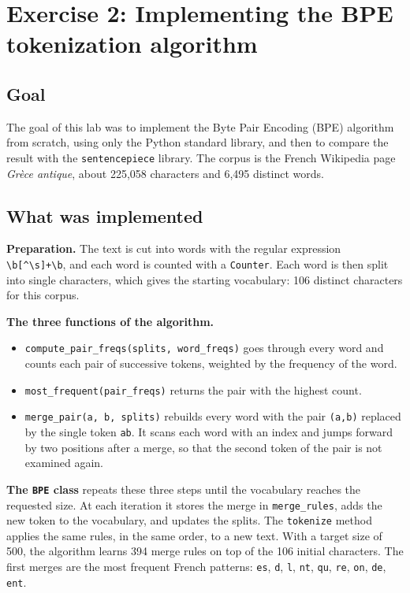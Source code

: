 \section{Exercise 2: Implementing the BPE tokenization algorithm}


\subsection*{Goal}

The goal of this lab was to implement the Byte Pair Encoding (BPE) algorithm from
scratch, using only the Python standard library, and then to compare the result with
the \texttt{sentencepiece} library. The corpus is the French Wikipedia page
\emph{Grèce antique}, about 225{,}058 characters and 6{,}495 distinct words.

\subsection*{What was implemented}

\textbf{Preparation.} The text is cut into words with the regular expression
\verb|\b[^\s]+\b|, and each word is counted with a \texttt{Counter}. Each word is then
split into single characters, which gives the starting vocabulary: 106 distinct
characters for this corpus.

\textbf{The three functions of the algorithm.}
\begin{itemize}
  \item \texttt{compute\_pair\_freqs(splits, word\_freqs)} goes through every word and
        counts each pair of successive tokens, weighted by the frequency of the word.
  \item \texttt{most\_frequent(pair\_freqs)} returns the pair with the highest count.
  \item \texttt{merge\_pair(a, b, splits)} rebuilds every word with the pair
        \texttt{(a,b)} replaced by the single token \texttt{ab}. It scans each word with
        an index and jumps forward by two positions after a merge, so that the second
        token of the pair is not examined again.
\end{itemize}

\textbf{The \texttt{BPE} class} repeats these three steps until the vocabulary reaches
the requested size. At each iteration it stores the merge in \texttt{merge\_rules}, adds
the new token to the vocabulary, and updates the splits. The \texttt{tokenize} method
applies the same rules, in the same order, to a new text. With a target size of 500, the
algorithm learns 394 merge rules on top of the 106 initial characters. The first merges
are the most frequent French patterns: \texttt{es}, \mk\texttt{d}, \mk\texttt{l},
\texttt{nt}, \texttt{qu}, \texttt{re}, \texttt{on}, \mk\texttt{de}, \texttt{ent}.

